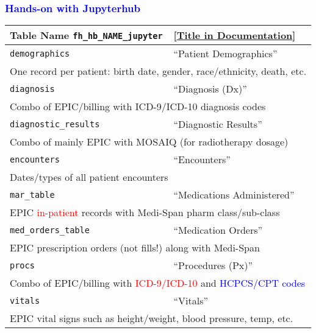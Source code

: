 \documentclass[11pt,pdftex,dvipsnames,usenames]{beamer}
\begin{document}
\begin{frame}[fragile]\frametitle{\bf\textcolor{blue}{Hands-on with Jupyterhub}}
\begin{tabular}{lll}
Table Name \texttt{fh\_hb\_NAME\_jupyter} & 
\textcolor{PineGreen}{[\href{https://ctri.mcw.edu/wp-content/uploads/CTSI-Honest-Broker-Data-Dictionary.pdf}{Title in Documentation}]} \\ \hline
\texttt{demographics}       & ``Patient Demographics'' \\ 
\multicolumn{3}{l}{One record per patient: birth date, gender, 
race/ethnicity, death, etc.} \\ \hline 
\texttt{diagnosis}          & ``Diagnosis (Dx)'' \\
\multicolumn{3}{l}{Combo of EPIC/billing with ICD-9/ICD-10 
diagnosis codes} \\  \hline  
\texttt{diagnostic\_results}& ``Diagnostic Results'' \\
\multicolumn{3}{l}{Combo of mainly EPIC with MOSAIQ (for radiotherapy dosage)} \\  \hline  
\texttt{encounters}       & ``Encounters'' \\ 
\multicolumn{3}{l}{Dates/types of all patient encounters} \\ \hline 
\texttt{mar\_table}         & ``Medications Administered''\\
\multicolumn{3}{l}{EPIC \textcolor{red}{in-patient} records with Medi-Span pharm class/sub-class} \\   \hline 
\texttt{med\_orders\_table} & ``Medication Orders'' \\
\multicolumn{3}{l}{EPIC prescription orders (not fills!) along with Medi-Span} \\  \hline  
\texttt{procs}              & ``Procedures (Px)'' \\
\multicolumn{3}{l}{Combo of EPIC/billing with 
\textcolor{red}{ICD-9/ICD-10} 
and \textcolor{blue}{HCPCS/CPT codes}} \\  \hline  
\texttt{vitals}             & ``Vitals'' \\
\multicolumn{3}{l}{EPIC vital signs such as height/weight, blood pressure,
temp, etc. } \\   \hline 
\end{tabular}
\end{frame}
\end{document}
